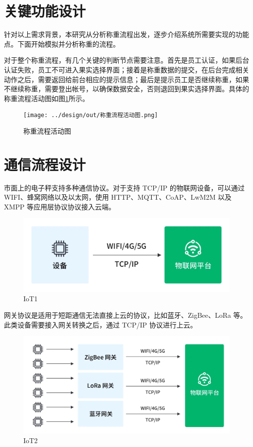 \section{关键功能设计}

针对以上需求背景，本研究从分析称重流程出发，逐步介绍系统所需要实现的功能点。下面开始模拟并分析称重的流程。

对于整个称重流程，有几个关键的判断节点需要注意。首先是员工认证，如果后台认证失败，员工不可进入果实选择界面；接着是称重数据的提交，在后台完成相关动作之后，需要返回给前台相应的提示信息；最后是提示员工是否继续称重，如果不继续称重，需要登出帐号，以确保数据安全，否则退回到果实选择界面。具体的称重流程活动图如图\ref{fig:称重流程活动图}所示。

\begin{figure}[H]
    \centering
    \texttt{[image: ../design/out/称重流程活动图.png]}
    \caption{称重流程活动图}
    \label{fig:称重流程活动图}
\end{figure}

\section{通信流程设计}

市面上的电子秤支持多种通信协议。对于支持 TCP/IP 的物联网设备，可以通过 WIFI、蜂窝网络以及以太网，使用 HTTP、MQTT、CoAP、LwM2M 以及 XMPP 等应用层协议协议接入云端。

\begin{figure}[H]
    \centering
    \includegraphics[width=0.8\linewidth]{../design/IoT1.png}
    \caption{IoT1}
    \label{fig:IoT1}
\end{figure}

网关协议是适用于短距通信无法直接上云的协议，比如蓝牙、ZigBee、LoRa 等。此类设备需要接入网关转换之后，通过 TCP/IP 协议进行上云。

\begin{figure}[H]
    \centering
    \includegraphics[width=0.8\linewidth]{../design/IoT2.png}
    \caption{IoT2}
    \label{fig:IoT2}
\end{figure}

